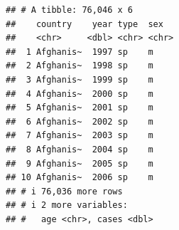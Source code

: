 \documentclass[
]{latex/krantz}
\theoremstyle{definition}
\theoremstyle{definition}
\theoremstyle{definition}
\theoremstyle{definition}
\theoremstyle{remark}
\begin{document}
\begin{verbatim}
## # A tibble: 76,046 x 6
##    country    year type  sex  
##    <chr>     <dbl> <chr> <chr>
##  1 Afghanis~  1997 sp    m    
##  2 Afghanis~  1998 sp    m    
##  3 Afghanis~  1999 sp    m    
##  4 Afghanis~  2000 sp    m    
##  5 Afghanis~  2001 sp    m    
##  6 Afghanis~  2002 sp    m    
##  7 Afghanis~  2003 sp    m    
##  8 Afghanis~  2004 sp    m    
##  9 Afghanis~  2005 sp    m    
## 10 Afghanis~  2006 sp    m    
## # i 76,036 more rows
## # i 2 more variables:
## #   age <chr>, cases <dbl>
\end{verbatim}

\backmatter

  

\printindex
\end{document}
